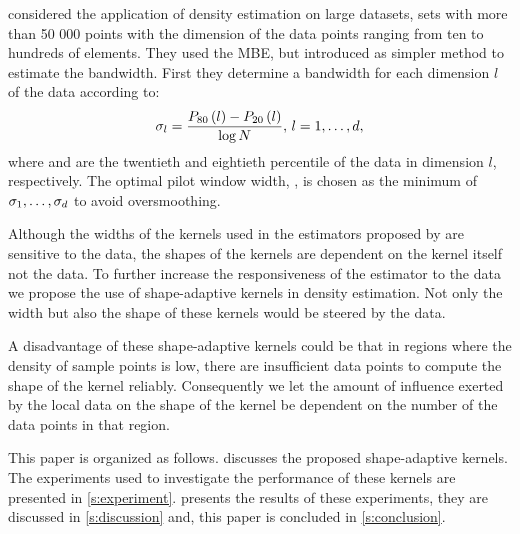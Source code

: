 	\textcite{ferdosi2011comparison} considered the application of density estimation on large datasets, \ie sets with more than 50 000 points with the dimension of the data points ranging from ten to hundreds of elements. They used the MBE, but introduced as simpler method to estimate the bandwidth. First they determine a bandwidth for each dimension $l$ of the data according to:
		\begin{equation}\label{eq:1:ferdosiGeneralBandwidth}
			\sigma_l = \frac{P_{80}\left( l \right) - P_{20}\left( l \right)}{\log N}, \, l = 1, \dotsc, d,
		\end{equation}
	where  and  are the twentieth and eightieth percentile of the data in dimension $l$, respectively. 
	The optimal pilot window width, \varBandwidth, is chosen as the minimum of $\sigma_1, \dotsc, \sigma_d$ to avoid oversmoothing.

	Although the widths of the kernels used in the estimators proposed by \citeauthor{breiman1977variable,wilkinson1995dataplot} are sensitive to the data, the shapes of the kernels are dependent on the kernel itself not the data. To further increase the responsiveness of the estimator to the data we propose the use of shape-adaptive kernels in density estimation. Not only the width but also the shape of these kernels would be steered by the data.

	A disadvantage of these shape-adaptive kernels could be that in regions where the density of sample points is low, there are insufficient data points to compute the shape of the kernel reliably. Consequently we let the amount of influence exerted by the local data on the shape of the kernel be dependent on the number of the data points in that region.

	This paper is organized as follows.  discusses the proposed shape-adaptive kernels. The experiments used to investigate the performance of these kernels are presented in \cref{s:experiment}.  presents the results of these experiments, they are discussed in \cref{s:discussion} and, this paper is concluded in \cref{s:conclusion}.